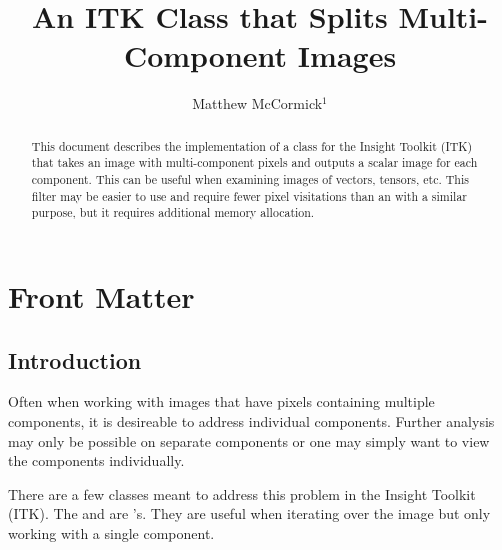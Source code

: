 \documentclass{InsightArticle}
\title{An ITK Class that Splits Multi-Component Images}
\author{Matthew McCormick$^{1}$}
\newcommand{\IJhandlerIDnumber}{3159}
\begin{document}
%
%
\IJhandlefooter{\IJhandlerIDnumber}


\ifpdf
\else
\fi


\maketitle


\ifhtml
\chapter*{Front Matter\label{front}}
\fi


\begin{abstract} \noindent This document describes the implementation of a class
for the Insight Toolkit (ITK) that takes an image with multi-component pixels and
outputs a scalar image for each component.  This can be useful when examining images
of vectors, tensors, etc.  This filter may be easier to use and require fewer
pixel visitations than an  with a similar purpose,
but it requires additional memory allocation.
\end{abstract}

\IJhandlenote{\IJhandlerIDnumber}

\tableofcontents

\section{Introduction}

Often when working with images that have pixels containing multiple components,
it is desireable to address individual components.  Further analysis may only be
possible on separate components or one may simply want to view the components
individually.

There are a few classes meant to address this problem in the Insight Toolkit
(ITK).  The  and 
are 's.  They are useful when iterating over the image but
only working with a single component.
\end{document}
